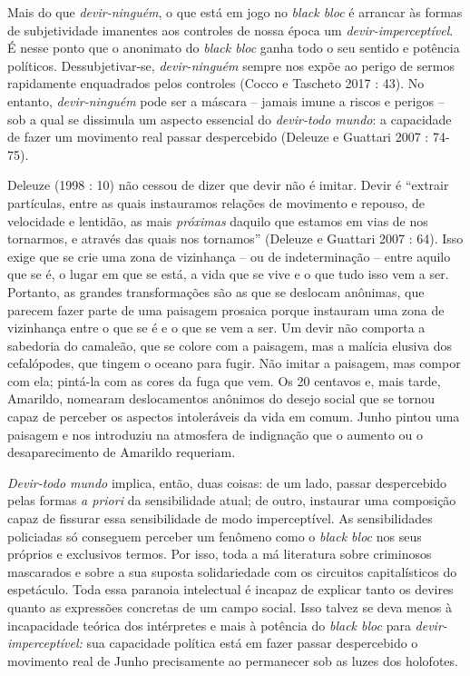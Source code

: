 Mais do que \emph{devir-ninguém}, o que está em jogo no \emph{black bloc
}é arrancar às formas de subjetividade imanentes aos controles de nossa
época um \emph{devir-imperceptível}. É nesse ponto que o anonimato do
\emph{black bloc} ganha todo o seu sentido e potência políticos.
Dessubjetivar-se, \emph{devir-ninguém} sempre nos expõe ao perigo de
sermos rapidamente enquadrados pelos controles (Cocco e Tascheto 2017 :
43). No entanto, \emph{devir-ninguém} pode ser a máscara -- jamais imune
a riscos e perigos -- sob a qual se dissimula um aspecto essencial do
\emph{devir-todo mundo}: a capacidade de fazer um movimento real passar
despercebido (Deleuze e Guattari 2007 : 74-75).

Deleuze (1998 : 10) não cessou de dizer que devir não é imitar. Devir é
``extrair partículas, entre as quais instauramos relações de movimento e
repouso, de velocidade e lentidão, as mais\emph{ próximas }daquilo que
estamos em vias de nos tornarmos, e através das quais nos tornamos''
(Deleuze e Guattari 2007 : 64). Isso exige que se crie uma zona de
vizinhança -- ou de indeterminação -- entre aquilo que se é, o lugar em
que se está, a vida que se vive e o que tudo isso vem a ser. Portanto,
as grandes transformações são as que se deslocam anônimas, que parecem
fazer parte de uma paisagem prosaica porque instauram uma zona de
vizinhança entre o que se é e o que se vem a ser. Um devir não comporta
a sabedoria do camaleão, que se colore com a paisagem, mas a malícia
elusiva dos cefalópodes, que tingem o oceano para fugir. Não imitar a
paisagem, mas compor com ela; pintá-la com as cores da fuga que vem. Os
20 centavos e, mais tarde, Amarildo, nomearam deslocamentos anônimos do
desejo social que se tornou capaz de perceber os aspectos intoleráveis
da vida em comum. Junho pintou uma paisagem e nos introduziu na
atmosfera de indignação que o aumento ou o desaparecimento de Amarildo
requeriam.

\emph{Devir-todo mundo} implica, então, duas coisas: de um lado, passar
despercebido pelas formas \emph{a priori} da sensibilidade atual; de
outro, instaurar uma composição capaz de fissurar essa sensibilidade de
modo imperceptível. As sensibilidades policiadas só conseguem perceber
um fenômeno como o \emph{black bloc} nos seus próprios e exclusivos
termos. Por isso, toda a má literatura sobre criminosos mascarados e
sobre a sua suposta solidariedade com os circuitos capitalísticos do
espetáculo. Toda essa paranoia intelectual é incapaz de explicar tanto
os devires quanto as expressões concretas de um campo social. Isso
talvez se deva menos à incapacidade teórica dos intérpretes e mais à
potência do \emph{black bloc }para \emph{devir-imperceptível:} sua
capacidade política está em fazer passar despercebido o movimento real
de Junho precisamente ao permanecer sob as luzes dos holofotes.

